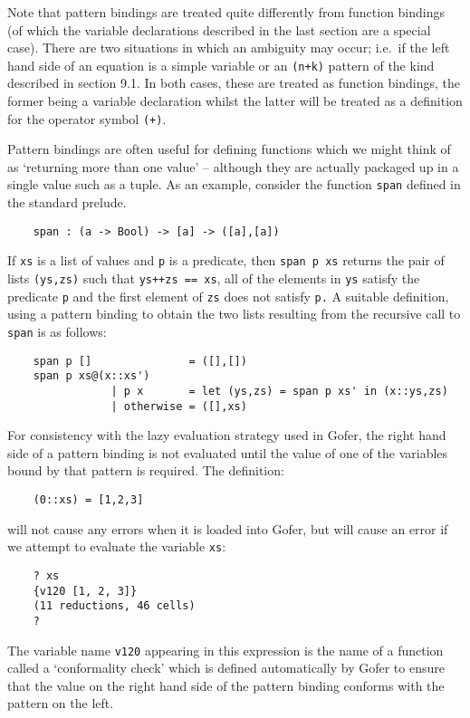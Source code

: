 Note that pattern bindings are treated quite  differently  from
function bindings (of which the variable declarations described in  the
last section are a special case).  There are two situations in which an
ambiguity may occur; i.e.\ if the left hand side of  an  equation  is  a
simple variable or an \verb"(n+k)" pattern of the kind  described  in  section
9.1.  In both cases, these are treated as function bindings, the former
being a variable declaration whilst the latter will  be  treated  as  a
definition for the operator symbol \verb"(+)".

Pattern bindings are often useful for defining functions which we might
think of as `returning more  than  one  value'  --  although  they  are
actually packaged up in a single value such as a tuple.  As an example,
consider the function \verb"span" defined in the standard prelude.
\begin{verbatim}
    span : (a -> Bool) -> [a] -> ([a],[a])
\end{verbatim}
If \verb"xs" is a list of values and \verb"p"
is a predicate, then \verb"span p xs"  returns
the pair of lists \verb"(ys,zs)" such that \verb"ys++zs == xs", 
all of  the  elements
in \verb"ys" satisfy the predicate \verb"p" 
and the first  element  of  \verb"zs" does  not
satisfy \verb"p." A suitable definition, using a pattern  binding  to  obtain
the two lists resulting  from  the  recursive  call  to  \verb"span"  is  as
follows:
\begin{verbatim}
    span p []               = ([],[])
    span p xs@(x::xs')
                | p x       = let (ys,zs) = span p xs' in (x::ys,zs)
                | otherwise = ([],xs)
\end{verbatim}
For consistency with the lazy evaluation strategy used  in  Gofer,  the
right hand side of a pattern binding is not evaluated until  the  value
of one of the  variables  bound  by  that  pattern  is  required.   The
definition:
\begin{verbatim}
    (0::xs) = [1,2,3]
\end{verbatim}
will not cause any errors when it is loaded into Gofer, but will  cause
an error if we attempt to evaluate the variable \verb"xs":
\begin{verbatim}
    ? xs
    {v120 [1, 2, 3]}
    (11 reductions, 46 cells)
    ?
\end{verbatim}
The variable name \verb"v120" appearing in this expression is the name of  a
function called a `conformality check' which is  defined  automatically
by Gofer to ensure that the value on the right hand side of the pattern
binding conforms with the pattern on the left.

